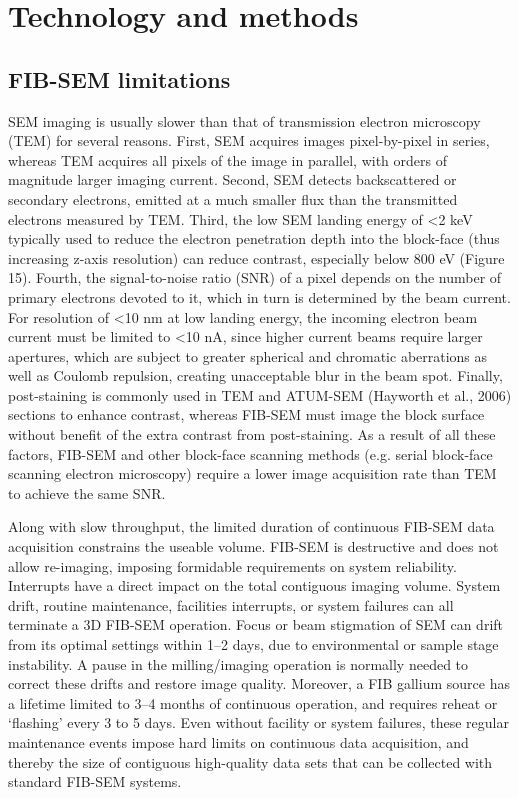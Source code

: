 \documentclass{article}
\begin{document}
\section*{Technology and methods}

\subsection*{FIB-SEM limitations}

SEM imaging is usually slower than that of transmission electron microscopy (TEM) for several reasons. First, SEM acquires images pixel-by-pixel in series, whereas TEM acquires all pixels of the image in parallel, with orders of magnitude larger imaging current. Second, SEM detects backscattered or secondary electrons, emitted at a much smaller flux than the transmitted electrons measured by TEM. Third, the low SEM landing energy of <2 keV typically used to reduce the electron penetration depth into the block-face (thus increasing z-axis resolution) can reduce contrast, especially below 800 eV (Figure 15). Fourth, the signal-to-noise ratio (SNR) of a pixel depends on the number of primary electrons devoted to it, which in turn is determined by the beam current. For resolution of <10 nm at low landing energy, the incoming electron beam current must be limited to <10 nA, since higher current beams require larger apertures, which are subject to greater spherical and chromatic aberrations as well as Coulomb repulsion, creating unacceptable blur in the beam spot. Finally, post-staining is commonly used in TEM and ATUM-SEM (Hayworth et al., 2006) sections to enhance contrast, whereas FIB-SEM must image the block surface without benefit of the extra contrast from post-staining. As a result of all these factors, FIB-SEM and other block-face scanning methods (e.g. serial block-face scanning electron microscopy) require a lower image acquisition rate than TEM to achieve the same SNR.

Along with slow throughput, the limited duration of continuous FIB-SEM data acquisition constrains the useable volume. FIB-SEM is destructive and does not allow re-imaging, imposing formidable requirements on system reliability. Interrupts have a direct impact on the total contiguous imaging volume. System drift, routine maintenance, facilities interrupts, or system failures can all terminate a 3D FIB-SEM operation. Focus or beam stigmation of SEM can drift from its optimal settings within 1–2 days, due to environmental or sample stage instability. A pause in the milling/imaging operation is normally needed to correct these drifts and restore image quality. Moreover, a FIB gallium source has a lifetime limited to 3–4 months of continuous operation, and requires reheat or ‘flashing’ every 3 to 5 days. Even without facility or system failures, these regular maintenance events impose hard limits on continuous data acquisition, and thereby the size of contiguous high-quality data sets that can be collected with standard FIB-SEM systems.
\end{document}
